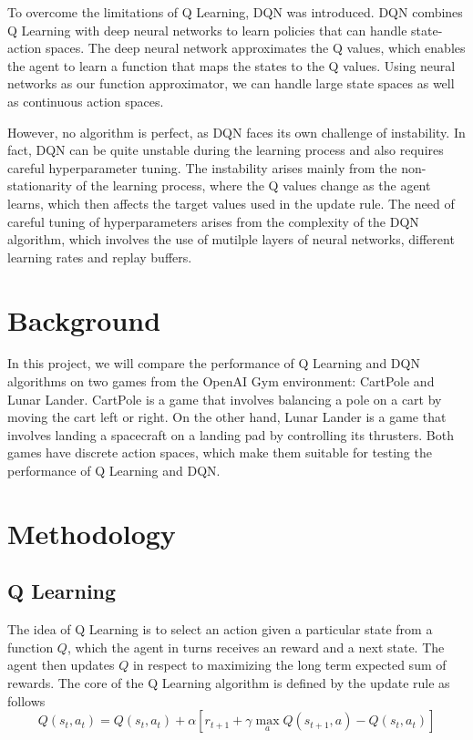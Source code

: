 \documentclass{article}
\begin{document}
To overcome the limitations of Q Learning, DQN was introduced. DQN combines Q
Learning with deep neural networks to learn policies that can handle
state-action spaces. The deep neural network approximates the Q values, which
enables the agent to learn a function that maps the states to the Q values.
Using neural networks as our function approximator, we can handle large state
spaces as well as continuous action spaces.

However, no algorithm is perfect, as DQN faces its own challenge of
instability. In fact, DQN can be quite unstable during the learning process and
also requires careful hyperparameter tuning. The instability arises mainly from
the non-stationarity of the learning process, where the Q values change as the
agent learns, which then affects the target values used in the update rule. The
need of careful tuning of hyperparameters arises from the complexity of the DQN
algorithm, which involves the use of mutilple layers of neural networks,
different learning rates and replay buffers.


\section{Background}

In this project, we will compare the performance of Q Learning and DQN
algorithms on two games from the OpenAI Gym environment: CartPole and Lunar
Lander. CartPole is a game that involves balancing a pole on a cart by moving
the cart left or right. On the other hand, Lunar Lander is a game that involves
landing a spacecraft on a landing pad by controlling its thrusters. Both games
have discrete action spaces, which make them suitable for testing the
performance of Q Learning and DQN.

\section{Methodology}
\subsection{Q Learning}
The idea of Q Learning is to select an action given a particular state from a
function \(Q\), which the agent in turns receives an reward and a next state.
The agent then updates \(Q\) in respect to maximizing the long term expected
sum of rewards. The core of the Q Learning algorithm is defined by the update
rule as follows
\begin{equation}
      Q(s_t, a_t) = Q(s_t, a_t) + \alpha \left[r_{t+1} + \gamma \max_{a} Q(s_{t+1}, a) - Q(s_t, a_t)\right]
      \label{eq:q_update_rule}
\end{equation}
\end{document}
